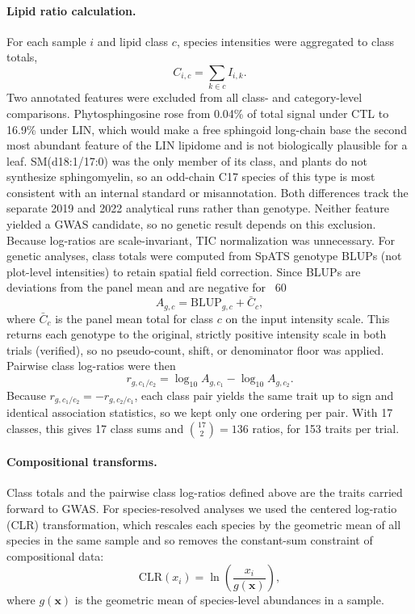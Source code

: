 \documentclass[9pt,twocolumn,twoside]{rilabRxiv}
\begin{document}
\paragraph{Lipid ratio calculation.}
For each sample $i$ and lipid class $c$, species intensities were aggregated to class totals,
\[
C_{i,c}=\sum_{k \in c} I_{i,k}.
\]
Two annotated features were excluded from all class- and category-level comparisons. Phytosphingosine rose from 0.04\% of total signal under CTL to 16.9\% under LIN, which would make a free sphingoid long-chain base the second most abundant feature of the LIN lipidome and is not biologically plausible for a leaf. SM(d18:1/17:0) was the only member of its class, and plants do not synthesize sphingomyelin, so an odd-chain C17 species of this type is most consistent with an internal standard or misannotation. Both differences track the separate 2019 and 2022 analytical runs rather than genotype. Neither feature yielded a GWAS candidate, so no genetic result depends on this exclusion. Because log-ratios are scale-invariant, TIC normalization was unnecessary. For genetic analyses, class totals were computed from SpATS genotype BLUPs (not plot-level intensities) to retain spatial field correction. Since BLUPs are deviations from the panel mean and are negative for ~60%
\[
A_{g,c}=\mathrm{BLUP}_{g,c}+\bar{C}_{c},
\]
where $\bar{C}_{c}$ is the panel mean total for class $c$ on the input intensity scale. This returns each genotype to the original, strictly positive intensity scale in both trials (verified), so no pseudo-count, shift, or denominator floor was applied. Pairwise class log-ratios were then
\[
r_{g,c_1/c_2}=\log_{10}A_{g,c_1}-\log_{10}A_{g,c_2}.
\]
Because $r_{g,c_1/c_2}=-r_{g,c_2/c_1}$, each class pair yields the same trait up to sign and identical association statistics, so we kept only one ordering per pair. With 17 classes, this gives 17 class sums and $\binom{17}{2}=136$ ratios, for 153 traits per trial.

\paragraph{Compositional transforms.}
Class totals and the pairwise class log-ratios defined above are the traits carried forward to GWAS. For species-resolved analyses we used the centered log-ratio (CLR) transformation, which rescales each species by the geometric mean of all species in the same sample and so removes the constant-sum constraint of compositional data:
\[
\mathrm{CLR}(x_i)=\ln\!\left(\frac{x_i}{g(\mathbf{x})}\right),
\]
where $g(\mathbf{x})$ is the geometric mean of species-level abundances in a sample.
\end{document}
